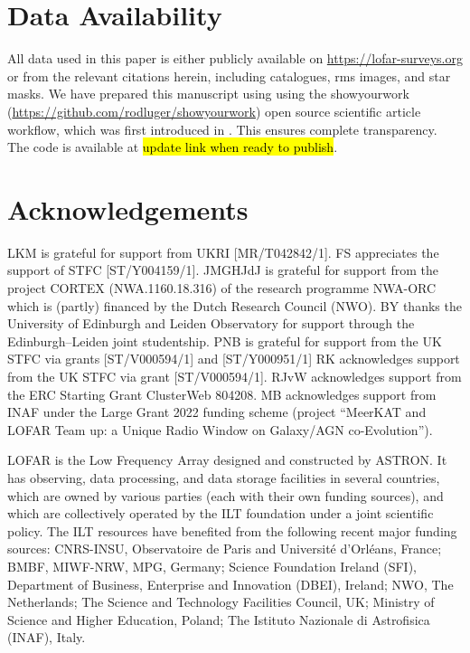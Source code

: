 \documentclass[usenatbib,fleqn,letters]{mnras}
\begin{document}

\section*{Data Availability}
All data used in this paper is either publicly available on \href{https://lofar-surveys.org}{https://lofar-surveys.org} or from the relevant citations herein, including catalogues, rms images, and star masks. We have prepared this manuscript using using the showyourwork (\href{https://github.com/rodluger/showyourwork}{https://github.com/rodluger/showyourwork}) open source scientific article workflow, which was first introduced in \cite{luger_mapping_2021}. This ensures complete transparency. The code is available at \hl{update link when ready to publish}. 

\section*{Acknowledgements}
LKM is grateful for support from UKRI [MR/T042842/1]. 
FS appreciates the support of STFC [ST/Y004159/1]. 
JMGHJdJ is grateful for support from the project CORTEX (NWA.1160.18.316) of the research programme NWA-ORC which is (partly) financed by the Dutch Research Council (NWO). 
BY thanks the University of Edinburgh and Leiden Observatory for support through the Edinburgh–Leiden joint studentship.
PNB is grateful for support from the UK STFC via grants [ST/V000594/1] and [ST/Y000951/1]
RK acknowledges support from the UK STFC via grant [ST/V000594/1].
RJvW acknowledges support from the ERC Starting Grant ClusterWeb 804208. 
MB acknowledges support from INAF under the Large Grant 2022 funding scheme (project “MeerKAT and LOFAR Team up: a Unique Radio Window on Galaxy/AGN co-Evolution”).

 
LOFAR is the Low Frequency Array designed and constructed by ASTRON. It has observing, data processing, and data storage facilities in several countries, which are owned by various parties (each with their own funding sources), and which are collectively operated by the ILT foundation under a joint scientific policy. The ILT resources have benefited from the following recent major funding sources: CNRS-INSU, Observatoire de Paris and Université d'Orléans, France; BMBF, MIWF-NRW, MPG, Germany; Science Foundation Ireland (SFI), Department of Business, Enterprise and Innovation (DBEI), Ireland; NWO, The Netherlands; The Science and Technology Facilities Council, UK; Ministry of Science and Higher Education, Poland; The Istituto Nazionale di Astrofisica (INAF), Italy. 
\end{document}
